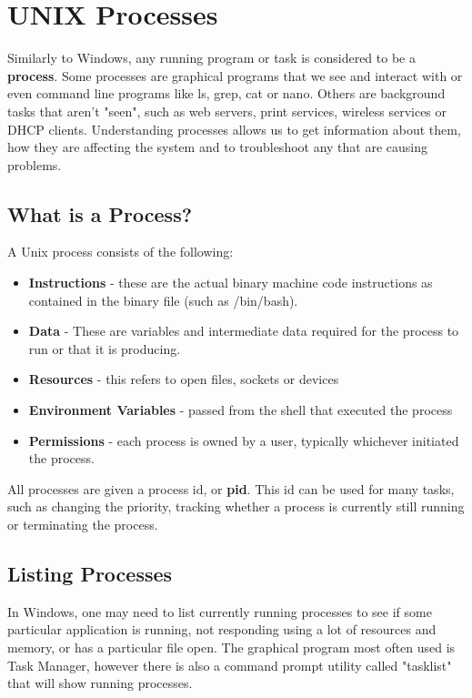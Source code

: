 \chapter{UNIX Processes}

Similarly to Windows, any running program or task is considered to be a \textbf{process}.  Some processes are graphical programs that we see and interact with or even command line programs like ls, grep, cat or nano.  Others are background tasks that aren't "seen", such as web servers, print services, wireless services or DHCP clients.  Understanding processes allows us to get information about them, how they are affecting the system and to troubleshoot any that are causing problems.

\section{What is a Process?}

A Unix process consists of the following:

\begin{itemize}
   \item \textbf{Instructions} - these are the actual binary machine code instructions as contained in the binary file (such as /bin/bash).
   \item \textbf{Data} - These are variables and intermediate data required for the process to run or that it is producing.
   \item \textbf{Resources} - this refers to open files, sockets or devices
   \item \textbf{Environment Variables} - passed from the shell that executed the process
   \item \textbf{Permissions} - each process is owned by a user, typically whichever initiated the process.
\end{itemize}

All processes are given a process id, or \textbf{pid}.  This id can be used for many tasks, such as changing the priority, tracking whether a process is currently still running or terminating the process.

\section{Listing Processes}

In Windows, one may need to list currently running processes to see if some particular application is running, not responding using a lot of resources and memory, or has a particular file open.  The graphical program most often used is Task Manager, however there is also a command prompt utility called "tasklist" that will show running processes.\\

